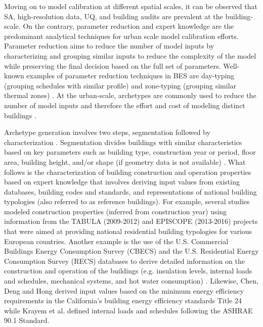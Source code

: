 \documentclass[review]{elsarticle}
\begin{document}
Moving on to model calibration at different spatial scales, it can be observed that SA, high-resolution data, UQ, and building audits are prevalent at the building-scale. On the contrary, parameter reduction and expert knowledge are the predominant analytical techniques for urban scale model calibration efforts. Parameter reduction aims to reduce the number of model inputs by characterizing and grouping similar inputs to reduce the complexity of the model while preserving the final decision based on the full set of parameters. Well-known examples of parameter reduction techniques in BES are day-typing (grouping schedules with similar profile) and zone-typing (grouping similar thermal zones) \cite{coakley2014review}. At the urban-scale, archetypes are commonly used to reduce the number of model inputs and therefore the effort and cost of modeling distinct buildings \cite{sokol2017validation, fernandez2020novel, kristensen2020long, tardioli2020methodology, hedegaard2019bottom, wang2020bayesian, chen2020automatic}. 

Archetype generation involves two steps, segmentation followed by characterization \cite{reinhart2016urban}. Segmentation divides buildings with similar characteristics based on key parameters such as building type, construction year or period, floor area, building height, and/or shape (if geometry data is not available) \cite{sokol2017validation, fernandez2020novel, kristensen2020long, tardioli2020methodology}. What follows is the characterization of building construction and operation properties based on expert knowledge that involves deriving input values from existing databases, building codes and standards, and representations of national building typologies (also referred to as reference buildings). For example, several studies \cite{kristensen2020long, hedegaard2019bottom, wang2020bayesian} modeled construction properties (inferred from construction year) using information from the TABULA (2009-2012) and EPISCOPE (2013-2016) projects \cite{ballarini2014use,loga2016tabula} that were aimed at providing national residential building typologies for various European countries. Another example is the use of the U.S. Commercial Buildings Energy Consumption Survey (CBECS) and the U.S. Residential Energy Consumption Survey (RECS) databases to derive detailed information on the construction and operation of the buildings (e.g. insulation levels, internal loads and schedules, mechanical systems, and hot water consumption) \cite{taylor2019multi, sokol2017validation}. Likewise, Chen, Deng and Hong \cite{chen2020automatic} derived input values based on the minimum energy efficiency requirements in the California's building energy efficiency standards Title 24 while Krayem et al. \cite{krayem2019urban} defined internal loads and schedules following the ASHRAE 90.1 Standard.
\end{document}
